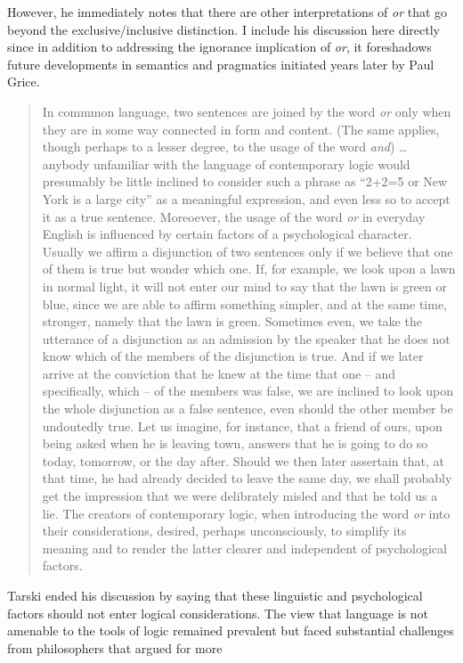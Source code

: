 \documentclass[oneside]{report}
\theoremstyle{definition}
\theoremstyle{definition}
\theoremstyle{definition}
\theoremstyle{remark}
\begin{document}
However, he immediately notes that there are other interpretations of
\emph{or} that go beyond the exclusive/inclusive distinction. I include
his discussion here directly since in addition to addressing the
ignorance implication of \emph{or}, it foreshadows future developments
in semantics and pragmatics initiated years later by Paul Grice.
\begin{quote}
In commmon language, two sentences are joined by the word \emph{or} only
when they are in some way connected in form and content. (The same
applies, though perhaps to a lesser degree, to the usage of the word
\emph{and}) \ldots{} anybody unfamiliar with the language of
contemporary logic would presumably be little inclined to consider such
a phrase as ``2+2=5 or New York is a large city'' as a meaningful
expression, and even less so to accept it as a true sentence. Moreoever,
the usage of the word \emph{or} in everyday English is influenced by
certain factors of a psychological character. Usually we affirm a
disjunction of two sentences only if we believe that one of them is true
but wonder which one. If, for example, we look upon a lawn in normal
light, it will not enter our mind to say that the lawn is green or blue,
since we are able to affirm something simpler, and at the same time,
stronger, namely that the lawn is green. Sometimes even, we take the
utterance of a disjunction as an admission by the speaker that he does
not know which of the members of the disjunction is true. And if we
later arrive at the conviction that he knew at the time that one -- and
specifically, which -- of the members was false, we are inclined to look
upon the whole disjunction as a false sentence, even should the other
member be undoutedly true. Let us imagine, for instance, that a friend
of ours, upon being asked when he is leaving town, answers that he is
going to do so today, tomorrow, or the day after. Should we then later
assertain that, at that time, he had already decided to leave the same
day, we shall probably get the impression that we were delibrately
misled and that he told us a lie. The creators of contemporary logic,
when introducing the word \emph{or} into their considerations, desired,
perhaps unconsciously, to simplify its meaning and to render the latter
clearer and independent of psychological factors.
\end{quote}
Tarski ended his discussion by saying that these linguistic and
psychological factors should not enter logical considerations. The view
that language is not amenable to the tools of logic remained prevalent
but faced substantial challenges from philosophers that argued for more
\end{document}
